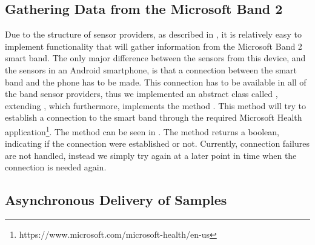 \subsection{Gathering Data from the Microsoft Band 2}
Due to the structure of sensor providers, as described in , it is relatively easy to implement functionality that will gather information from the Microsoft Band 2 smart band. The only major difference between the sensors from this device, and the sensors in an Android smartphone, is that a connection between the smart band and the phone has to be made. This connection has to be available in all of the band sensor providers, thus we implemented an abstract class called , extending , which furthermore, implements the method . This method will try to establish a connection to the smart band through the required Microsoft Health application\footnote{https://www.microsoft.com/microsoft-health/en-us}. The method can be seen in . The method returns a boolean, indicating if the connection were established or not. Currently, connection failures are not handled, instead we simply try again at a later point in time when the connection is needed again.




\FloatBarrier

\subsection{Asynchronous Delivery of Samples}

